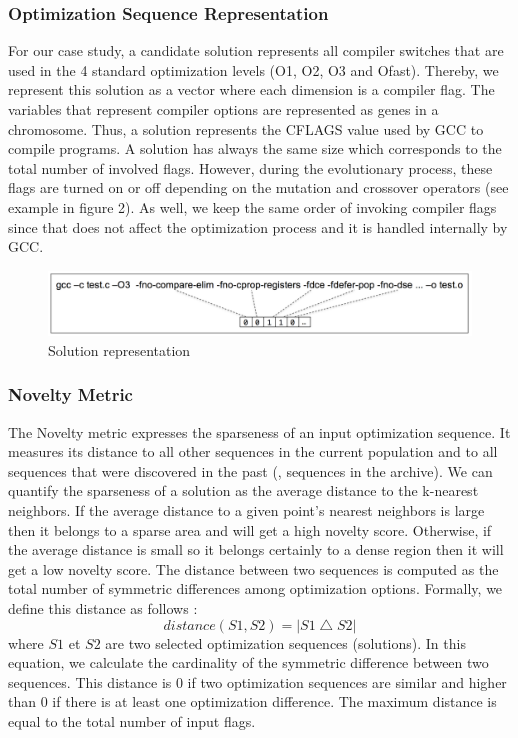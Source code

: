 \subsubsection{Optimization Sequence Representation}
For our case study, a candidate solution represents all compiler switches that are used in the 4 standard optimization levels (O1, O2, O3 and Ofast). Thereby, we represent this solution as a vector where each dimension is a compiler flag. 
The variables that represent compiler options are represented as genes in a chromosome. 
Thus, a solution represents the CFLAGS value used by GCC to compile programs.
A solution has always the same size which corresponds to the total number of involved flags. 
However, during the evolutionary process, these flags are turned on or off depending on the mutation and crossover operators (see example in figure 2). As well, we keep the same order of invoking compiler flags since that does not affect the optimization process and it is handled internally by GCC.
\begin{figure}[h]
	\centering
	\includegraphics[width=1\hsize]{Ressources/individual.png}
	\caption{Solution representation}
	
\end{figure}

\subsubsection{Novelty Metric}
The Novelty metric expresses the sparseness of an input optimization sequence. It measures its distance to all other sequences in the current population and to all sequences that were discovered in the past (\ie, sequences in the archive). 
We can quantify the sparseness of a solution as the average distance to the k-nearest neighbors. 
If the average distance to a given point's nearest neighbors is large then it belongs to a sparse area and will get a high novelty score. 
Otherwise, if the average distance is small so it belongs certainly to a dense region then it will get a low novelty score. 
The distance between two sequences is computed as the total number of symmetric differences among optimization options. Formally, we define this distance as follows :
\begin{equation}
distance(S1,S2)=\left | S1 \bigtriangleup S2 \right |
\end{equation}
where $S1$ et $S2$ are two selected optimization sequences (solutions). In this equation, we calculate the cardinality of the symmetric difference between two sequences. This distance is 0 if two optimization sequences are similar and higher than 0 if there is at least one optimization difference. The maximum distance is equal to the total number of input flags.

